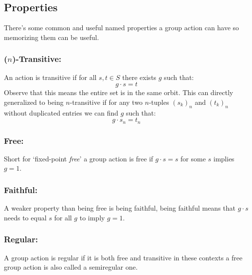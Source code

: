 \subsection{Properties}
There's some common and useful named properties a group action can have so memorizing them can be useful.

\subsubsection{($n$)-Transitive:}
An action is transitive if for all $s,t\in S$ there exists $g$ such that:
\[g\cdot s = t\]
Observe that this means the entire set is in the same orbit.
This can directly generalized to being $n$-transitive if for any two $n$-tuples   $(s_k)_n$ and $(t_k)_n$ without duplicated entries we can find $g$ such that:
\[g\cdot s_n = t_n\]

\subsubsection{Free:}
Short for `fixed-point {\em free}' a group action is free if $g\cdot s=s$ for some $s$ implies $g=1$. 

\subsubsection{Faithful:}
A weaker property than being free is being faithful,
being faithful means that $g\cdot s$ needs to equal $s$ for all $g$ to imply $g=1$.

\subsubsection{Regular:}
A group action is regular if it is both free and transitive in these contexts a free group action is also called a semiregular one.
